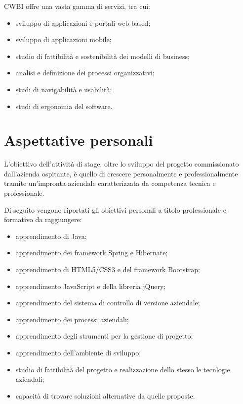 \setlength{\parskip}{3ex}

\noindent CWBI offre una vasta gamma di servizi, tra cui:
\begin{itemize}
\item sviluppo di applicazioni e portali web-based;
\item sviluppo di applicazioni mobile;
\item studio di fattibilità e sostenibilità dei modelli di business;
\item analisi e definizione dei processi organizzativi;
\item studi di navigabilità e usabilità;
\item studi di ergonomia del software.
\end{itemize}

\section{Aspettative personali}
L'obiettivo dell'attività di stage, oltre lo sviluppo del progetto commissionato dall'azienda ospitante, è quello di crescere personalmente e professionalmente tramite un'impronta aziendale caratterizzata da competenza tecnica e professionale.

\setlength{\parskip}{3ex}

\noindent Di seguito vengono riportati gli obiettivi personali a titolo professionale e formativo da raggiungere:
\begin{itemize}
\item apprendimento di Java;
\item apprendimento dei framework Spring e Hibernate;
\item apprendimento di HTML5/CSS3 e del framework Bootstrap;
\item apprendimento JavaScript e della libreria jQuery;
\item apprendimento del sistema di controllo di versione aziendale;
\item apprendimento dei processi aziendali;
\item apprendimento degli strumenti per la gestione di progetto;
\item apprendimento dell’ambiente di sviluppo;
\item studio di fattibilità del progetto e realizzazione dello stesso le tecnlogie aziendali;
\item capacità di trovare soluzioni alternative da quelle proposte.
\end{itemize}

